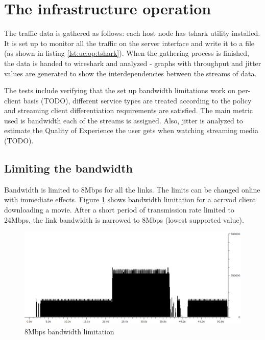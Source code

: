 \documentclass[11pt]{book}
\begin{document}
    \section{The infrastructure operation}
    \label{sec:uc:operation}

      The traffic data is gathered as follows: each host node has tshark utility installed. It is set up to monitor all
      the traffic on the server interface and write it to a file (as shown in listing \ref{lst:uc:op:tshark}). When the
      gathering process is finished, the data is handed to wireshark and analyzed - graphs with throughput and jitter
      values are generated to show the interdependencies between the streams of data. \\

      \noindent
      \begin{minipage}{\textwidth}
        
      \end{minipage}

      The tests include verifying that the set up bandwidth limitations work on per-client basis (TODO), different
      service types are treated according to the policy and streaming client differentiation requirements are satisfied.
      The main metric used is bandwidth each of the streams is assigned. Also, jitter is analyzed to estimate the
      Quality of Experience the user gets when watching streaming media (TODO).


      \subsection{Limiting the bandwidth}
      \label{sub:uc:limit}

        Bandwidth is limited to 8Mbps for all the links. The limits can be changed online with immediate effects. Figure
        \ref{fig:uc:limit} shows bandwidth limitation for a \gls{acr:vod} client downloading a movie. After a short period of
        transmission rate limited to 24Mbps, the link bandwidth is narrowed to 8Mbps (lowest supported value).

        \begin{figure}[H]
          \begin{center}
            \includegraphics[width=.7\textwidth]{img/test-case/limit.png}
          \end{center}

          \caption{8Mbps bandwidth limitation}
          \label{fig:uc:limit}
        \end{figure}
\end{document}

